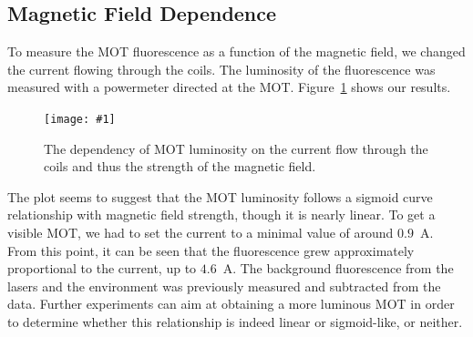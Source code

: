 \documentclass[twocolumn]{article}
\newcommand{\insertFigure}[1]{%
   \texttt{[image: \#1]}%
}
\begin{document}
\subsection{Magnetic Field Dependence}
To measure the MOT fluorescence as a function of the magnetic field, we changed the current flowing through the coils. The luminosity of the fluorescence was measured with a powermeter directed at the MOT. Figure~\ref{fig:magnetic} shows our results. 
\begin{figure} [!h]
	\centering
	\insertFigure{Images/magnetic_dependence_wo_linear.png}
	\caption{The dependency of MOT luminosity on the current flow through the coils and thus the strength of the magnetic field.}
	\label{fig:magnetic}
\end{figure}
The plot seems to suggest that the MOT luminosity follows a sigmoid curve relationship with magnetic field strength, though it is nearly linear. To get a visible MOT, we had to set the current to a minimal value of around $0.9$~A. From this point, it can be seen that the fluorescence grew approximately proportional to the current, up to $4.6$~A. The background fluorescence from the lasers and the environment was previously measured and subtracted from the data. Further experiments can aim at obtaining a more luminous MOT in order to determine whether this relationship is indeed linear or sigmoid-like, or neither.
\end{document}
